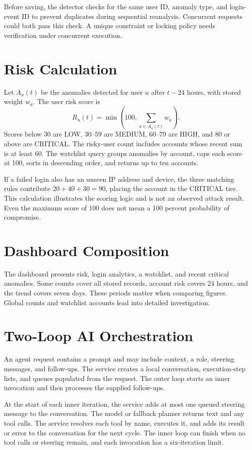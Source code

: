Before saving, the detector checks for the same user ID, anomaly type, and login-event ID to prevent duplicates during sequential reanalysis. Concurrent requests could both pass this check. A unique constraint or locking policy needs verification under concurrent execution.

\section{Risk Calculation}
Let $A_u(t)$ be the anomalies detected for user $u$ after $t-24$ hours, with stored weight $w_a$. The user risk score is
\begin{equation}R_u(t)=\min\left(100,\sum_{a\in A_u(t)}w_a\right).\end{equation}
Scores below 30 are LOW, 30--59 are MEDIUM, 60--79 are HIGH, and 80 or above are CRITICAL. The risky-user count includes accounts whose recent sum is at least 60. The watchlist query groups anomalies by account, caps each score at 100, sorts in descending order, and returns up to ten accounts.

If a failed login also has an unseen IP address and device, the three matching rules contribute $20+40+30=90$, placing the account in the CRITICAL tier. This calculation illustrates the scoring logic and is not an observed attack result. Even the maximum score of 100 does not mean a 100 percent probability of compromise.

\section{Dashboard Composition}
The dashboard presents risk, login analytics, a watchlist, and recent critical anomalies. Some counts cover all stored records, account risk covers 24 hours, and the trend covers seven days. These periods matter when comparing figures. Global counts and watchlist accounts lead into detailed investigation.

\section{Two-Loop AI Orchestration}
An agent request contains a prompt and may include context, a role, steering messages, and follow-ups. The service creates a local conversation, execution-step lists, and queues populated from the request. The outer loop starts an inner invocation and then processes the supplied follow-ups.


At the start of each inner iteration, the service adds at most one queued steering message to the conversation. The model or fallback planner returns text and any tool calls. The service resolves each tool by name, executes it, and adds its result or error to the conversation for the next cycle. The inner loop can finish when no tool calls or steering remain, and each invocation has a six-iteration limit.


